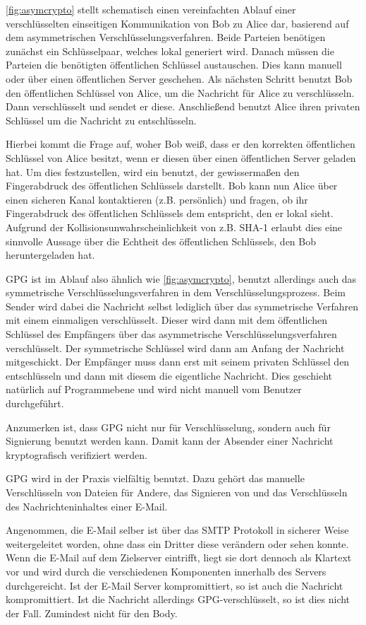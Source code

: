 \autoref{fig:asymcrypto} stellt schematisch einen vereinfachten Ablauf einer verschlüsselten einseitigen Kommunikation von Bob zu Alice dar, basierend auf dem asymmetrischen Verschlüsselungsverfahren. Beide Parteien benötigen zunächst ein Schlüsselpaar, welches lokal generiert wird. Danach müssen die Parteien die benötigten öffentlichen Schlüssel austauschen. Dies kann manuell oder über einen öffentlichen Server geschehen. Als nächsten Schritt benutzt Bob den öffentlichen Schlüssel von Alice, um die Nachricht für Alice zu verschlüsseln. Dann verschlüsselt und sendet er diese. Anschließend benutzt Alice ihren privaten Schlüssel um die Nachricht zu entschlüsseln. 

Hierbei kommt die Frage auf, woher Bob weiß, dass er den korrekten öffentlichen Schlüssel von Alice besitzt, wenn er diesen über einen öffentlichen Server geladen hat. Um dies festzustellen, wird ein  benutzt, der gewissermaßen den Fingerabdruck des öffentlichen Schlüssels darstellt. Bob kann nun Alice über einen sicheren Kanal kontaktieren (z.B. persönlich) und fragen, ob ihr Fingerabdruck des öffentlichen Schlüssels dem entspricht, den er lokal sieht. Aufgrund der Kollisionsunwahrscheinlichkeit von z.B. SHA-1 erlaubt dies eine sinnvolle Aussage über die Echtheit des öffentlichen Schlüssels, den Bob heruntergeladen hat. 

GPG ist im Ablauf also ähnlich wie \autoref{fig:asymcrypto}, benutzt allerdings auch das symmetrische Verschlüsselungsverfahren in dem Verschlüsselungsprozess. Beim Sender wird dabei die Nachricht selbst lediglich über das symmetrische Verfahren mit einem einmaligen  verschlüsselt. Dieser  wird dann mit dem öffentlichen Schlüssel des Empfängers über das asymmetrische Verschlüsselungsverfahren verschlüsselt. Der symmetrische Schlüssel wird dann am Anfang der Nachricht mitgeschickt. Der Empfänger muss dann erst mit seinem privaten Schlüssel den  entschlüsseln und dann mit diesem die eigentliche Nachricht. Dies geschieht natürlich auf Programmebene und wird nicht manuell vom Benutzer durchgeführt. 

Anzumerken ist, dass GPG nicht nur für Verschlüsselung, sondern auch für Signierung benutzt werden kann. Damit kann der Absender einer Nachricht kryptografisch verifiziert werden. 

GPG wird in der Praxis vielfältig benutzt. Dazu gehört das manuelle Verschlüsseln von Dateien für Andere, das Signieren von 
und das Verschlüsseln des Nachrichteninhaltes einer E-Mail.

Angenommen, die E-Mail selber ist über das SMTP Protokoll in sicherer Weise weitergeleitet worden, ohne dass ein Dritter diese verändern oder sehen konnte. Wenn die E-Mail auf dem Zielserver eintrifft, liegt sie dort dennoch als Klartext vor und wird durch die verschiedenen Komponenten innerhalb des Servers durchgereicht. Ist der E-Mail Server kompromittiert, so ist auch die Nachricht kompromittiert. Ist die Nachricht allerdings GPG-verschlüsselt, so ist dies nicht der Fall. Zumindest nicht für den Body.
